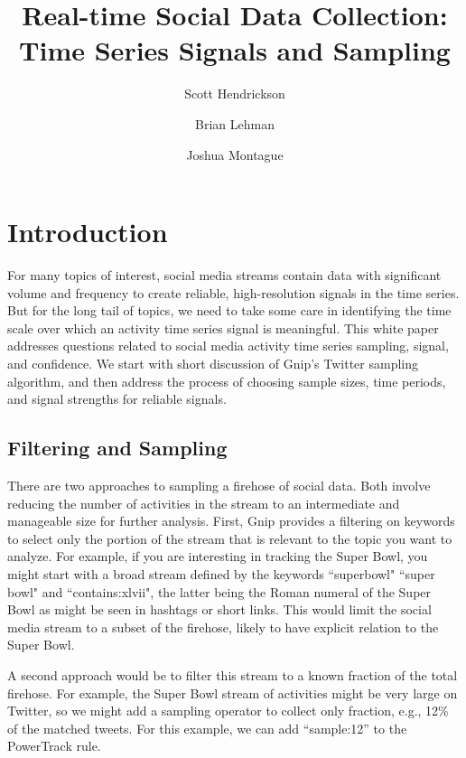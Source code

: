 \documentclass{article}
\title{Real-time Social Data Collection: \\ \Large{Time Series Signals and Sampling} }
\author[]{Scott Hendrickson}
\author[]{Brian Lehman}
\author[]{Joshua Montague}
\affil[]{ \Large{Gnip, Inc.} }
\begin{document}
\maketitle


\section{Introduction}

For many topics of interest, social media streams contain data with significant volume and frequency to create reliable, high-resolution signals in the time series.  But for the 
long tail of topics, we need to take some care in identifying the 
time scale over which an activity time series signal is meaningful. This white paper addresses questions related to social media activity time series sampling, signal, and confidence. We start with short discussion of Gnip's Twitter sampling algorithm, and then address the process of choosing sample sizes, time periods, and signal strengths for reliable signals.

\subsection{Filtering and Sampling} 

There are two approaches to sampling a firehose of social data. Both involve reducing the number of activities in the stream to an intermediate and manageable size for further analysis.  
First, Gnip provides a filtering on keywords to select only the portion of the stream that is relevant to the topic you want to analyze. For example, if you are interesting in tracking the Super Bowl, you might start with a broad stream defined by the keywords ``superbowl" ``super bowl" and ``contains:xlvii", the latter being the Roman numeral of the Super Bowl as might be seen in hashtags or short links. This would limit the social media stream to a subset of the firehose, likely to have explicit relation to the Super Bowl.

A second approach would be to filter this stream to a known fraction of the total firehose. For example, the 
Super Bowl stream of activities might be very large on Twitter, so we might add a sampling operator to collect only fraction, e.g., 12\% of the matched tweets. For this example, we can add ``sample:12'' to the PowerTrack rule.
\end{document}
